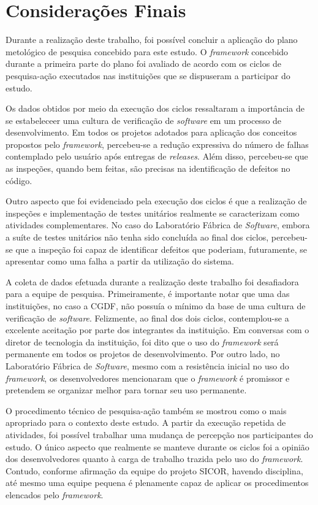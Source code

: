\chapter{Considerações Finais}

Durante a realização deste trabalho, foi possível concluir a aplicação do plano metológico de pesquisa concebido para este estudo. O \textit{framework} concebido durante a primeira parte do plano foi avaliado de acordo com os ciclos de pesquisa-ação executados nas instituições que se dispuseram a participar do estudo.

Os dados obtidos por meio da execução dos ciclos ressaltaram a importância de se estabeleceer uma cultura de verificação de \textit{software} em um processo de desenvolvimento. Em todos os projetos adotados para aplicação dos conceitos propostos pelo \textit{framework}, percebeu-se a redução expressiva do número de falhas contemplado pelo usuário após entregas de \textit{releases}. Além disso, percebeu-se que as inspeções, quando bem feitas, são precisas na identificação de defeitos no código.

Outro aspecto que foi evidenciado pela execução dos ciclos é que a realização de inspeções e implementação de testes unitários realmente se caracterizam como atividades complementares. No caso do Laboratório Fábrica de \textit{Software}, embora a suíte de testes unitários não tenha sido concluída ao final dos ciclos, percebeu-se que a inspeção foi capaz de identificar defeitos que poderiam, futuramente, se apresentar como uma falha a partir da utilização do sistema.

A coleta de dados efetuada durante a realização deste trabalho foi desafiadora para a equipe de pesquisa. Primeiramente, é importante notar que uma das instituições, no caso a CGDF, não possuía o mínimo da base de uma cultura de verificação de \textit{software}. Felizmente, ao final dos dois ciclos, contemplou-se a excelente aceitação por parte dos integrantes da instituição. Em conversas com o diretor de tecnologia da instituição, foi dito que o uso do \textit{framework} será permanente em todos os projetos de desenvolvimento. Por outro lado, no Laboratório Fábrica de \textit{Software}, mesmo com a resistência inicial no uso do \textit{framework}, os desenvolvedores mencionaram que o \textit{framework} é promissor e pretendem se organizar melhor para tornar seu uso permanente.

O procedimento técnico de pesquisa-ação também se mostrou como o mais apropriado para o contexto deste estudo. A partir da execução repetida de atividades, foi possível trabalhar uma mudança de percepção nos participantes do estudo. O único aspecto que realmente se manteve durante os ciclos foi a opinião dos desenvolvedores quanto à carga de trabalho trazida pelo uso do \textit{framework}. Contudo, conforme afirmação da equipe do projeto SICOR, havendo disciplina, até mesmo uma equipe pequena é plenamente capaz de aplicar os procedimentos elencados pelo \textit{framework}.

